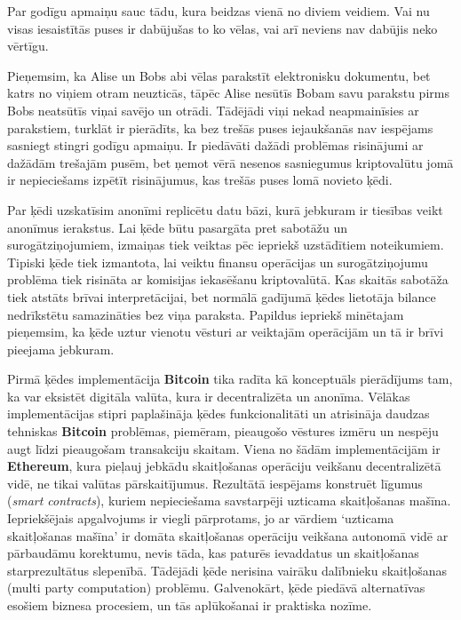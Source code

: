 Par godīgu apmaiņu sauc tādu, kura beidzas vienā no diviem veidiem. Vai nu visas iesaistītās puses ir dabūjušas to ko vēlas, vai arī neviens nav dabūjis neko vērtīgu.

Pieņemsim, ka Alise un Bobs abi vēlas parakstīt elektronisku dokumentu, bet katrs no viņiem otram neuzticās, tāpēc Alise nesūtīs Bobam savu parakstu pirms Bobs neatsūtīs viņai savējo un otrādi. 
Tādējādi viņi nekad neapmainīsies ar parakstiem, turklāt ir pierādīts, ka bez trešās puses iejaukšanās nav iespējams sasniegt stingri godīgu apmaiņu.\cite{pagnia99}
Ir piedāvāti dažādi problēmas risinājumi ar dažādām trešajām pusēm, bet ņemot vērā nesenos sasniegumus kriptovalūtu jomā ir nepieciešams izpētīt risinājumus, kas trešās puses lomā novieto ķēdi. 

Par ķēdi uzskatīsim anonīmi replicētu datu bāzi, kurā jebkuram ir tiesības veikt anonīmus ierakstus. Lai ķēde būtu pasargāta pret sabotāžu un surogātziņojumiem, izmaiņas tiek veiktas pēc iepriekš uzstādītiem noteikumiem.
Tipiski ķēde tiek izmantota, lai veiktu finansu operācijas un surogātziņojumu problēma tiek risināta ar komisijas iekasēšanu kriptovalūtā. Kas skaitās sabotāža tiek atstāts brīvai interpretācijai, bet normālā gadījumā ķēdes lietotāja bilance nedrīkstētu samazināties bez viņa paraksta. Papildus iepriekš minētajam pieņemsim, ka ķēde uztur vienotu vēsturi ar veiktajām operācijām un tā ir brīvi pieejama jebkuram.

Pirmā ķēdes implementācija \textbf{Bitcoin} tika radīta kā konceptuāls pierādījums tam, ka var eksistēt digitāla valūta, kura ir decentralizēta un anonīma. 
Vēlākas implementācijas stipri paplašināja ķēdes funkcionalitāti un atrisināja daudzas tehniskas \textbf{Bitcoin} problēmas, piemēram, pieaugošo vēstures izmēru un nespēju augt līdzi pieaugošam transakciju skaitam.\cite{barber12}
Viena no šādām implementācijām ir \textbf{Ethereum}, kura pieļauj jebkādu skaitļošanas operāciju veikšanu decentralizētā vidē, ne tikai valūtas pārskaitījumus.\cite{etherum}
Rezultātā iespējams konstruēt līgumus (\textit{smart contracts}), kuriem nepieciešama savstarpēji uzticama skaitļošanas mašīna.
Iepriekšējais apgalvojums ir viegli pārprotams, jo ar vārdiem `uzticama skaitļošanas mašīna' ir domāta skaitļošanas operāciju veikšana autonomā vidē ar pārbaudāmu korektumu, nevis tāda, kas paturēs ievaddatus un skaitļošanas starprezultātus slepenībā.
Tādējādi ķēde nerisina vairāku dalībnieku skaitļošanas (multi party computation) problēmu.
Galvenokārt, ķēde piedāvā alternatīvas esošiem biznesa procesiem, un tās aplūkošanai ir praktiska nozīme.

